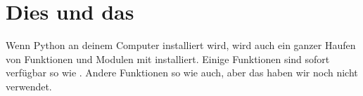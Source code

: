 \section{Dies und das} 

Wenn Python an deinem Computer installiert wird, wird auch ein ganzer Haufen von Funktionen und Modulen mit installiert. Einige Funktionen sind sofort verfügbar so wie . Andere Funktionen so wie  auch, aber das haben wir noch nicht verwendet.

